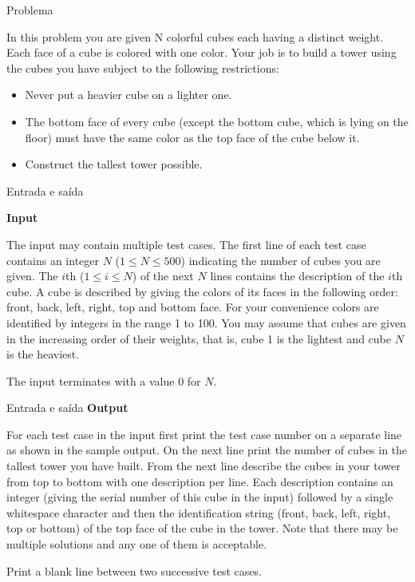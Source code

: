 
\begin{frame}[fragile]{Problema}

In this problem you are given N colorful cubes each having a distinct weight. Each face of a 
cube is colored with one color. Your job is to build a tower using the cubes you have subject 
to the following restrictions:

\begin{itemize}
    \item Never put a heavier cube on a lighter one.
    \item The bottom face of every cube (except the bottom cube, which is lying on the floor) 
        must have the same color as the top face of the cube below it.
    \item Construct the tallest tower possible.
\end{itemize}

\end{frame}

\begin{frame}[fragile]{Entrada e saída}

\textbf{Input}

The input may contain multiple test cases. The first line of each test case contains an integer
$N$ ($1\leq N\leq 500$) indicating the number of cubes you are given. The $i$th ($1\leq i\leq 
N$)
of the next $N$ lines contains the description of the $i$th cube. A cube is described by giving 
the colors of its faces in the following order: front, back, left, right, top and bottom face. 
For your convenience colors are identified by integers in the range 1 to 100. You may assume 
that cubes are given in the increasing order of their weights, that is, cube 1 is the lightest 
and cube $N$ is the heaviest.

The input terminates with a value 0 for $N$.

\end{frame}

\begin{frame}[fragile]{Entrada e saída}
\textbf{Output}

For each test case in the input first print the test case number on a separate line as shown 
in the sample output. On the next line print the number of cubes in the tallest tower you have 
built. From the next line describe the cubes in your tower from top to bottom with one 
description per line. Each description contains an integer (giving the serial number of this 
cube in the input) followed by a single whitespace character and then the identification string 
(front, back, left, right, top or bottom) of the top face of the cube in the tower. Note that 
there may be multiple solutions and any one of them is acceptable.

Print a blank line between two successive test cases.
\end{frame}


